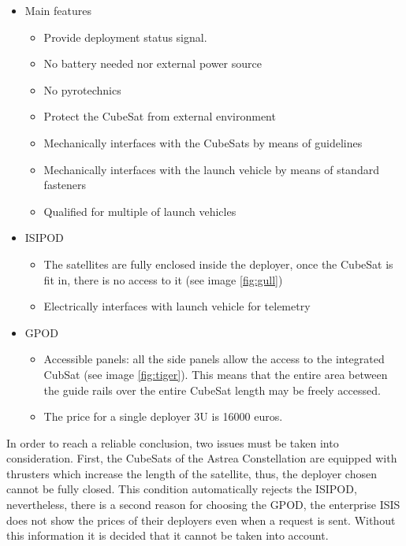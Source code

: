 \begin{itemize}
\item Main features
\begin{itemize}
\item Provide deployment status signal.
\item No battery needed nor external power source
\item No pyrotechnics
\item Protect the CubeSat from external environment
\item Mechanically interfaces with the CubeSats by means of guidelines
\item Mechanically interfaces with the launch vehicle by means of standard fasteners
\item Qualified for multiple of launch vehicles
\end{itemize}
\item ISIPOD 
\begin{itemize}
\item The satellites are fully enclosed inside the deployer, once the CubeSat is fit in, there is no access to it (see image \ref{fig:gull})
\item Electrically interfaces with launch vehicle for telemetry
\end{itemize}
\item GPOD
\begin{itemize}
\item Accessible panels: all the side panels allow the access to the integrated CubSat (see image \ref{fig:tiger}). This means that the entire area between the guide rails over the entire CubeSat length may be freely accessed. 
\item The price for a single deployer 3U is 16000 euros. 
\end{itemize}
\end{itemize}
In order to reach a reliable conclusion, two issues must be taken into consideration. First, the CubeSats of the Astrea Constellation are equipped with thrusters which increase the length of the satellite, thus, the deployer chosen cannot be fully closed. This condition automatically rejects the ISIPOD, nevertheless, there is a second reason for choosing the GPOD, the enterprise ISIS does not show the prices of their deployers even when a request is sent. Without this information it is decided that it cannot be taken into account. 
\newline

